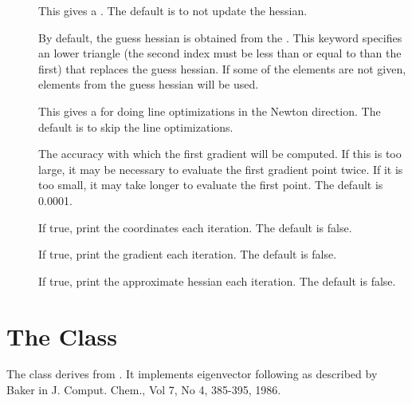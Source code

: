 \begin{description}
  \item[] This gives a 
     .  The default is to not update the
     hessian.

  \item[] By default, the guess hessian is obtained from the
      .  This keyword
     specifies an lower triangle  (the second
     index must be less than or equal to than the first) that replaces the
     guess hessian.  If some of the elements are not given, elements from
     the guess hessian will be used.

  \item[] This gives a 
      for doing line optimizations in the Newton
     direction.  The default is to skip the line optimizations.

  \item[] The accuracy with which the first gradient will
     be computed.  If this is too large, it may be necessary to evaluate
     the first gradient point twice.  If it is too small, it may take
     longer to evaluate the first point. The default is 0.0001.

  \item[] If true, print the coordinates each iteration.
     The default is false.

  \item[] If true, print the gradient each
    iteration. The default is false.

  \item[] If true, print the approximate hessian each
    iteration. The default is false.

\end{description}


\section{The  Class}\label{EFCOpt}

The  class derives from .  It implements
eigenvector following as described by Baker in J. Comput. Chem., Vol 7, No
4, 385-395, 1986.

